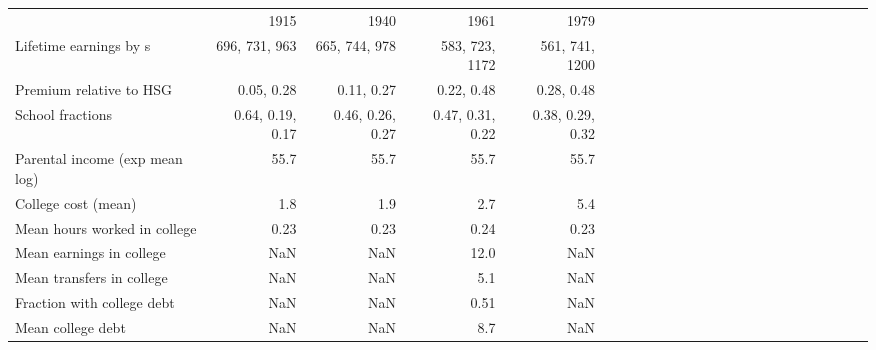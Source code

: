 \begin{tabular}{lrrrrrrrrrrrrrrrrrrrrrrr}
\hline
 & 1915  & 1940  & 1961  & 1979  &   &   &   &   &   &   &   &   &   &   &   &   &   &   &   &   &   &   &   \\
Lifetime earnings by s & 696, 731, 963  & 665, 744, 978  & 583, 723, 1172  & 561, 741, 1200  &   &   &   &   &   &   &   &   &   &   &   &   &   &   &   &   &   &   &   \\
Premium relative to HSG & 0.05, 0.28  & 0.11, 0.27  & 0.22, 0.48  & 0.28, 0.48  &   &   &   &   &   &   &   &   &   &   &   &   &   &   &   &   &   &   &   \\
School fractions & 0.64, 0.19, 0.17  & 0.46, 0.26, 0.27  & 0.47, 0.31, 0.22  & 0.38, 0.29, 0.32  &   &   &   &   &   &   &   &   &   &   &   &   &   &   &   &   &   &   &   \\
Parental income (exp mean log) & 55.7  & 55.7  & 55.7  & 55.7  &   &   &   &   &   &   &   &   &   &   &   &   &   &   &   &   &   &   &   \\
College cost (mean) & 1.8  & 1.9  & 2.7  & 5.4  &   &   &   &   &   &   &   &   &   &   &   &   &   &   &   &   &   &   &   \\
Mean hours worked in college & 0.23  & 0.23  & 0.24  & 0.23  &   &   &   &   &   &   &   &   &   &   &   &   &   &   &   &   &   &   &   \\
Mean earnings in college & NaN  & NaN  & 12.0  & NaN  &   &   &   &   &   &   &   &   &   &   &   &   &   &   &   &   &   &   &   \\
Mean transfers in college & NaN  & NaN  & 5.1  & NaN  &   &   &   &   &   &   &   &   &   &   &   &   &   &   &   &   &   &   &   \\
Fraction with college debt & NaN  & NaN  & 0.51  & NaN  &   &   &   &   &   &   &   &   &   &   &   &   &   &   &   &   &   &   &   \\
Mean college debt & NaN  & NaN  & 8.7  & NaN  &   &   &   &   &   &   &   &   &   &   &   &   &   &   &   &   &   &   &   \\
\hline
\end{tabular}%
